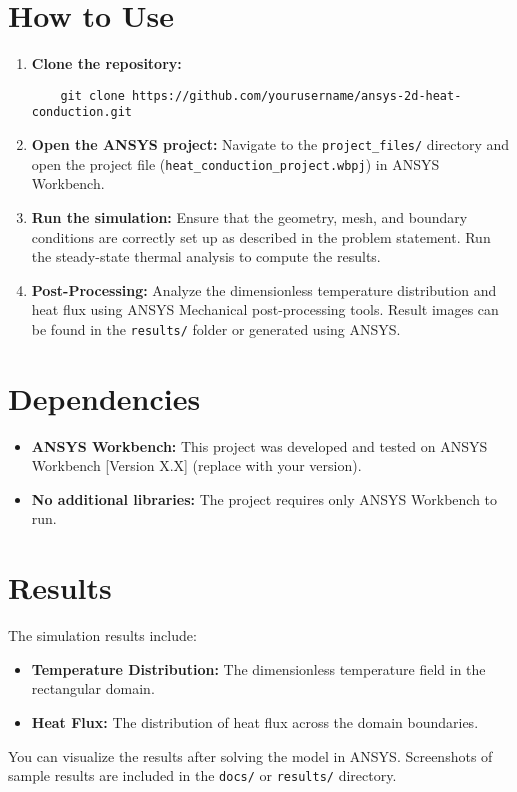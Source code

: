 \documentclass{article}
\begin{document}
\section*{How to Use}
\begin{enumerate}[label=\arabic*.]
    \item \textbf{Clone the repository:}
    \begin{verbatim}
    git clone https://github.com/yourusername/ansys-2d-heat-conduction.git
    \end{verbatim}
    \item \textbf{Open the ANSYS project:}
    Navigate to the \texttt{project\_files/} directory and open the project file (\texttt{heat\_conduction\_project.wbpj}) in ANSYS Workbench.
    \item \textbf{Run the simulation:}
    Ensure that the geometry, mesh, and boundary conditions are correctly set up as described in the problem statement. Run the steady-state thermal analysis to compute the results.
    \item \textbf{Post-Processing:}
    Analyze the dimensionless temperature distribution and heat flux using ANSYS Mechanical post-processing tools. Result images can be found in the \texttt{results/} folder or generated using ANSYS.
\end{enumerate}

\section*{Dependencies}
\begin{itemize}
    \item \textbf{ANSYS Workbench:} This project was developed and tested on ANSYS Workbench [Version X.X] (replace with your version).
    \item \textbf{No additional libraries:} The project requires only ANSYS Workbench to run.
\end{itemize}

\section*{Results}
The simulation results include:
\begin{itemize}
    \item \textbf{Temperature Distribution:} The dimensionless temperature field in the rectangular domain.
    \item \textbf{Heat Flux:} The distribution of heat flux across the domain boundaries.
\end{itemize}
You can visualize the results after solving the model in ANSYS. Screenshots of sample results are included in the \texttt{docs/} or \texttt{results/} directory.
\end{document}
